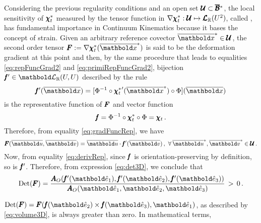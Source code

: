 Considering the previous regularity conditions and an open set $\pmb{\mathcal{U}}\subset\pmb{\overline{\mathcal{B}}}^*$, the local sensitivity of $\pmb{\chi}_t^*$ measured by the tensor function in $\nabla\pmb{\chi}_t^* : \pmb{\mathcal{U}} \mapsto \pmb{\mathcal{L}}_{\mathbb{R}}(U^{2})$, called , has fundamental importance in Continuum Kinematics because it bases the concept of strain. Given an arbitrary reference covector $\overline{\vto{x}}^*\in\pmb{\mathcal{U}}$, the second order tensor $\tnr{F}:=\fua{\nabla\tnr{\chi}_t^*}{\overline{\vto{x}}^*}$ is said to be the deformation gradient at this point and then, by the same procedure that leads to equalities \eqref{eq:repFuncGrad2} and \eqref{eq:primiRepFuncGrad2}, bijection $\tnr{\mathit{f}}'\in\evl{\real}{U}{U}$ described by the rule
\begin{equation}
\tnr{\mathit{f}}'(\overline{\vto{x}}) = [\Phi^{-1}\circ\fua{{\tnr{\chi}_t^{*}}'}{\overline{\vto{x}}^*}\circ\Phi](\overline{\vto{x}})
\end{equation}
is the representative function of $\pmb{F}$ and vector function
\begin{equation}
\pmb{\mathit{f}} = \Phi^{-1}\circ\pmb{\chi}_t^{*}\circ\Phi = \pmb{\chi}_t\,.
\end{equation}
Therefore, from equality \eqref{eq:gradFuncRep}, we have
\begin{equation}
\fua{\tnr{F}}{\overline{\vto{u}},\overline{\vto{v}}}=\overline{\vto{u}}\cdot\fua{\tnr{\mathit{f}}'}{\overline{\vto{v}}}\,,\,\,\forall\, \overline{\vto{u}}^*,\overline{\vto{v}}^*\in\pmb{\mathcal{U}}\,.
\end{equation}
Now, from equality \eqref{eq:derivRep}, since $\pmb{\mathit{f}}$ is orientation-preserving by definition, so is $\pmb{\mathit{f}}'$. Therefore, from expression \eqref{eq:det3D}, we conclude that
\begin{equation}
\hdet{\tnr{F}}=\dfrac{\fua{\tnr{A}_O}{\fua{\tnr{\mathit{f}}'}{\vun{e}_1},{\fua{\tnr{\mathit{f}}'}{\vun{e}_2}},{\fua{\tnr{\mathit{f}}'}{\vun{e}_3}}}}{\fua{\tnr{A}_O}{\vun{e}_1,\vun{e}_2,\vun{e}_3}}\,>\,0\,.
\end{equation}


$\hdet{\tnr{F}}=\fua{\tnr{F}}{\fua{\tnr{\mathit{f}}}{\vun{e}_2}\times\fua{\tnr{\mathit{f}}}{\vun{e}_3},\vun{e}_1}$, as described by \eqref{eq:volume3D}, is always greater than zero. In mathematical terms,




